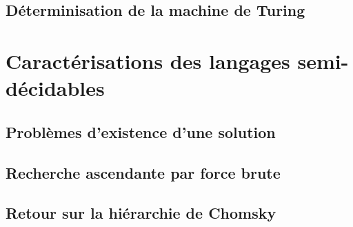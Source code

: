 \documentclass[9pt, handout]{beamer}
\begin{document}
\subsection{Déterminisation de la machine de Turing}





 
\section{Caractérisations des langages semi-décidables}
 
\subsection{Problèmes d'existence d'une solution}







 
\subsection{Recherche ascendante par force brute}






 
\subsection{Retour sur la hiérarchie de Chomsky}




 
\end{document}
